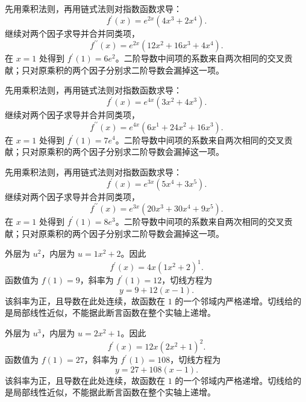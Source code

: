 \documentclass[12pt,fontset=fandol]{ctexart}
\begin{document}
\begin{solve}\label{ans:c8q4}
先用乘积法则，再用链式法则对指数函数求导：
\[
f^{\prime}(x)=e^{2x}(4x^{3}+2x^{4}).
\]
继续对两个因子求导并合并同类项，
\[
f^{\prime\prime}(x)=e^{2x}\left(12x^{2}+16x^{3}+4x^{4}\right).
\]
在 $x=1$ 处得到 $f^{\prime}(1)=6e^{2}$。二阶导数中间项的系数来自两次相同的交叉贡献；只对原乘积的两个因子分别求二阶导数会漏掉这一项。
\end{solve}

\begin{solve}\label{ans:c8q5}
先用乘积法则，再用链式法则对指数函数求导：
\[
f^{\prime}(x)=e^{4x}(3x^{2}+4x^{3}).
\]
继续对两个因子求导并合并同类项，
\[
f^{\prime\prime}(x)=e^{4x}\left(6x^{1}+24x^{2}+16x^{3}\right).
\]
在 $x=1$ 处得到 $f^{\prime}(1)=7e^{4}$。二阶导数中间项的系数来自两次相同的交叉贡献；只对原乘积的两个因子分别求二阶导数会漏掉这一项。
\end{solve}

\begin{solve}\label{ans:c8q6}
先用乘积法则，再用链式法则对指数函数求导：
\[
f^{\prime}(x)=e^{3x}(5x^{4}+3x^{5}).
\]
继续对两个因子求导并合并同类项，
\[
f^{\prime\prime}(x)=e^{3x}\left(20x^{3}+30x^{4}+9x^{5}\right).
\]
在 $x=1$ 处得到 $f^{\prime}(1)=8e^{3}$。二阶导数中间项的系数来自两次相同的交叉贡献；只对原乘积的两个因子分别求二阶导数会漏掉这一项。
\end{solve}

\begin{solve}\label{ans:c8q7}
外层为 $u^{2}$，内层为 $u=1x^2+2$。因此
\[
f^{\prime}(x)=4x(1x^2+2)^{1}.
\]
函数值为 $f(1)=9$，斜率为 $f^{\prime}(1)=12$，切线方程为
\[
y=9+12(x-1).
\]
该斜率为正，且导数在此处连续，故函数在 $1$ 的一个邻域内严格递增。切线给的是局部线性近似，不能据此断言函数在整个实轴上递增。
\end{solve}

\begin{solve}\label{ans:c8q8}
外层为 $u^{3}$，内层为 $u=2x^2+1$。因此
\[
f^{\prime}(x)=12x(2x^2+1)^{2}.
\]
函数值为 $f(1)=27$，斜率为 $f^{\prime}(1)=108$，切线方程为
\[
y=27+108(x-1).
\]
该斜率为正，且导数在此处连续，故函数在 $1$ 的一个邻域内严格递增。切线给的是局部线性近似，不能据此断言函数在整个实轴上递增。
\end{solve}
\end{document}
